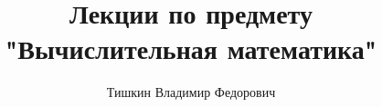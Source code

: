 \documentclass[12pt]{article}
\begin{document}
	
	\title{Лекции по предмету\\"Вычислительная математика"}
	\author{Тишкин Владимир Федорович}
	\date{}
	\maketitle
	\newpage
	
	\tableofcontents
		
	
	
	
	
\end{document}
